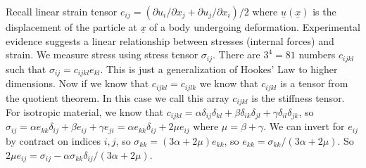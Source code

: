 \begin{example}
    Recall linear strain tensor $e_{ij}=(\partial u_i/\partial x_j+\partial u_j/\partial x_i)/2$ where $\underline{u}(\underline{x})$ is the displacement of the particle at $\underline{x}$ of a body undergoing deformation.
    Experimental evidence suggests a linear relationship between stresses (internal forces) and strain.
    We measure stress using stress tensor $\sigma_{ij}$.
    There are $3^4=81$ numbers $c_{ijkl}$ such that $\sigma_{ij}=c_{ijkl}e_{kl}$.
    This is just a generalization of Hookes' Law to higher dimensions.
    Now if we know that $c_{ijkl}=c_{ijlk}$ we know that $c_{ijkl}$ is a tensor from the quotient theorem.
    In this case we call this array $c_{ijkl}$ is the stiffness tensor.
    For isotropic material, we know that $c_{ijkl}=\alpha\delta_{ij}\delta_{kl}+\beta\delta_{ik}\delta_{jl}+\gamma\delta_{il}\delta_{jk}$, so $\sigma_{ij}=\alpha e_{kk}\delta_{ij}+\beta e_{ij}+\gamma e_{ji}=\alpha e_{kk}\delta_{ij}+2\mu e_{ij}$ where $\mu=\beta+\gamma$.
    We can invert for $e_{ij}$ by contract on indices $i,j$, so $\sigma_{kk}=(3\alpha+2\mu)e_{kk}$, so $e_{kk}=\sigma_{kk}/(3\alpha+2\mu)$.
    So $2\mu e_{ij}=\sigma_{ij}-\alpha\sigma_{kk}\delta_{ij}/(3\alpha+2\mu)$.
\end{example}
